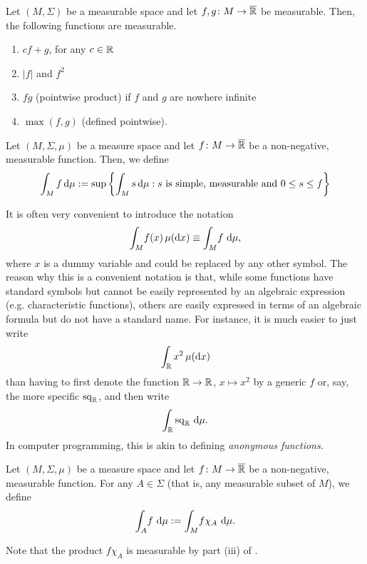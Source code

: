 \begin{lemma}
\label{lem:measurable}
Let $(M,\Sigma)$ be a measurable space and let $f,g\colon M\to
\overline{\mathbb{R}}$ be measurable. Then, the following functions are
measurable.
\begin{enumerate}[label=(\roman*)]
\item $cf+g$, for any $c\in \mathbb{R}$
\item $|f|$ and $f^2$
\item $fg$ (pointwise product) if $f$ and $g$ are nowhere infinite
\item $\max(f,g)$ (defined pointwise).
\end{enumerate}
\end{lemma}

\begin{definition}
  Let $(M,\Sigma,\mu)$ be a measure space and let $f\colon
  M\to\overline{\mathbb{R}}$ be a non-negative, measurable function.
  Then, we define
  \begin{equation*}
    \int_Mf\mathop{}\!\mathrm{d} \mu
    :=
    \sup\left\{
      \int_M s \mathop{}\!\mathrm{d} \mu : s \text{ is simple, measurable and } 0\leq s\leq f
    \right\}
  \end{equation*}
\end{definition}

\begin{remark}
It is often very convenient to introduce the notation
\begin{equation*}
\int_M\!f(x)\,\mu(\mathop{}\!\mathrm{d} x) \equiv \int_M\! f\, \mathop{}\!\mathrm{d} \mu,
\end{equation*}
where $x$ is a dummy variable and could be replaced by any other
symbol. The reason why this is a convenient notation is that, while
some functions have standard symbols but cannot be easily represented
by an algebraic expression (e.g. characteristic functions), others are
easily expressed in terms of an algebraic formula but do not have a
standard name. For instance, it is much easier to just write
\begin{equation*}
\int_{\mathbb{R}}  x^2\,\mu(\mathop{}\!\mathrm{d} x)
\end{equation*}
than having to first denote the function $\mathbb{R}\to\mathbb{R}$, $x\mapsto x^2$ by
a generic $f$ or, say, the more specific $\mathrm{sq}_{\mathbb{R}}$, and then
write
\begin{equation*}
\int_{\mathbb{R}}\mathrm{sq}_{\mathbb{R}}\, \mathop{}\!\mathrm{d} \mu.
\end{equation*}
In computer programming, this is akin to defining \emph{anonymous functions}.
\end{remark}

\begin{definition}
  Let $(M,\Sigma,\mu)$ be a measure space and let $f\colon
  M\to\overline{\mathbb{R}}$ be a non-negative, measurable function. For any
  $A\in \Sigma$ (that is, any measurable subset of $M$), we define
  \begin{equation*}
  \int_A\! f\, \mathop{}\!\mathrm{d} \mu := \int_M\! f\chi_A\, \mathop{}\!\mathrm{d} \mu.
  \end{equation*}
\end{definition}
Note that the product $f\chi_A$ is measurable by part (iii) of
.

